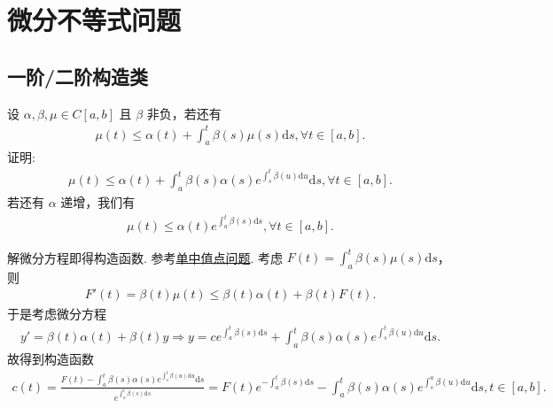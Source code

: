 \documentclass[../../main.tex]{subfiles}
\begin{document}
\section{微分不等式问题}

\subsection{一阶/二阶构造类}

\begin{proposition}[Gronwall不等式]\label{proposition:Gronwall不等式}
设 $\alpha,\beta,\mu\in C[a,b]$ 且 $\beta$ 非负，若还有
\begin{align}
\mu(t)\leqslant\alpha(t)+\int_{a}^{t}\beta(s)\mu(s)\mathrm{d}s,\forall t\in[a,b].
\label{equation---12.6}
\end{align}
证明:
\begin{align*}
\mu(t)\leqslant\alpha(t)+\int_{a}^{t}\beta(s)\alpha(s)e^{\int_{s}^{t}\beta(u)\mathrm{d}u}\mathrm{d}s,\forall t\in[a,b].
\end{align*}
若还有 $\alpha$ 递增，我们有
\begin{align*}
\mu(t)\leqslant\alpha(t)e^{\int_{a}^{t}\beta(s)\mathrm{d}s},\forall t\in[a,b].
\end{align*}
\end{proposition}
\begin{note}
解微分方程即得构造函数. 参考\hyperref[section单中值点问题]{单中值点问题}. 考虑 $F(t)=\int_{a}^{t}\beta(s)\mu(s)\mathrm{d}s$，则
\begin{align*}
F'(t)=\beta(t)\mu(t)\leqslant\beta(t)\alpha(t)+\beta(t)F(t).
\end{align*}
于是考虑微分方程
\begin{align*}
y'=\beta(t)\alpha(t)+\beta(t)y\Rightarrow y=ce^{\int_{a}^{t}\beta(s)\mathrm{d}s}+\int_{a}^{t}\beta(s)\alpha(s)e^{\int_{s}^{t}\beta(u)\mathrm{d}u}\mathrm{d}s.
\end{align*}
故得到构造函数
\begin{align*}
c(t)=\frac{F(t)-\int_{a}^{t}\beta(s)\alpha(s)e^{\int_{s}^{t}\beta(u)\mathrm{d}u}\mathrm{d}s}{e^{\int_{a}^{t}\beta(s)\mathrm{d}s}}=F(t)e^{-\int_{a}^{t}\beta(s)\mathrm{d}s}-\int_{a}^{t}\beta(s)\alpha(s)e^{\int_{s}^{a}\beta(u)\mathrm{d}u}\mathrm{d}s,t\in[a,b].
\end{align*} 
\end{note}
\end{document}
